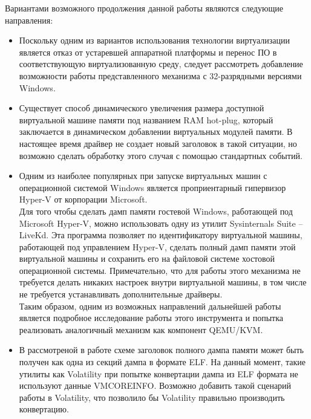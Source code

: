 \documentclass{mipt-thesis-bs}
\begin{document}
Вариантами возможного продолжения данной работы являются следующие направления:
\begin{itemize}
\item Поскольку одним из вариантов использования технологии виртуализации является отказ от устаревшей аппаратной платформы и перенос ПО в соответствующую виртуализованную среду, следует рассмотреть добавление возможности работы представленного механизма с 32-разрядными версиями Windows.
\item Существует способ динамического увеличения размера доступной виртуальной машине памяти под названием RAM hot-plug, который заключается в динамическом добавлении виртуальных модулей памяти. В настоящее время драйвер не создает новый заголовок в такой ситуации, но возможно сделать обработку этого случая с помощью стандартных событий.
\item Одним из наиболее популярных при запуске виртуальных машин с операционной системой Windows является проприентарный гипервизор Hyper-V от корпорации Microsoft.\\Для того чтобы сделать дамп памяти гостевой Windows, работающей под Microsoft Hyper-V, можно использовать одну из утилит Sysinternals Suite -- LiveKd\cite{livekd-hv}. Эта программа позволяет по идентификатору виртуальной машины, работающей под управлением Hyper-V, сделать полный дамп памяти этой виртуальной машины и сохранить его на файловой системе хостовой операционной системы. Примечательно, что для работы этого механизма не требуется делать никаких настроек внутри виртуальной машины, в том числе не требуется устанавливать дополнительные драйверы.\\Таким образом, одним из возможных направлений дальнейшей работы является подробное исследование работы этого инструмента и попытка реализовать аналогичный механизм как компонент QEMU/KVM.
\newpage
\item В рассмотреной в работе схеме заголовок полного дампа памяти может быть получен как одна из секций дампа в формате ELF. На данный момент, такие утилиты как Volatility при попытке конвертации дампа из ELF формата не используют данные VMCOREINFO. Возможно добавить такой сценарий работы в Volatility, что позволило бы Volatility правильно производить конвертацию.
\end{itemize}

\printbibliography
\end{document}
